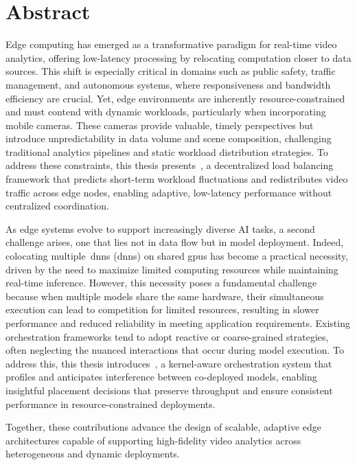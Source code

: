 \chapter*{Abstract}

Edge computing has emerged as a transformative paradigm for real-time video analytics, offering low-latency processing by relocating computation closer to data sources. This shift is especially critical in domains such as public safety, traffic management, and autonomous systems, where responsiveness and bandwidth efficiency are crucial. Yet, edge environments are inherently resource-constrained and must contend with dynamic workloads, particularly when incorporating mobile cameras. These cameras provide valuable, timely perspectives but introduce unpredictability in data volume and scene composition, challenging traditional analytics pipelines and static workload distribution strategies. To address these constraints, this thesis presents~\videojam{}, a decentralized load balancing framework that predicts short-term workload fluctuations and redistributes video traffic across edge nodes, enabling adaptive, low-latency performance without centralized coordination.

As edge systems evolve to support increasingly diverse AI tasks, a second challenge arises, one that lies not in data flow but in model deployment. Indeed, colocating multiple~\acrlong{dnn}s (\acrshort{dnn}s) on shared \acrshort{gpu}s has become a practical necessity, driven by the need to maximize limited computing resources while maintaining real-time inference. However, this necessity poses a fundamental challenge because when multiple models share the same hardware, their simultaneous execution can lead to competition for limited resources, resulting in slower performance and reduced reliability in meeting application requirements. Existing orchestration frameworks tend to adopt reactive or coarse-grained strategies, often neglecting the nuanced interactions that occur during model execution. To address this, this thesis introduces~\roomie{}, a kernel-aware orchestration system that profiles and anticipates interference between co-deployed models, enabling insightful placement decisions that preserve throughput and ensure consistent performance in resource-constrained deployments.

Together, these contributions advance the design of scalable, adaptive edge architectures capable of supporting high-fidelity video analytics across heterogeneous and dynamic deployments.


